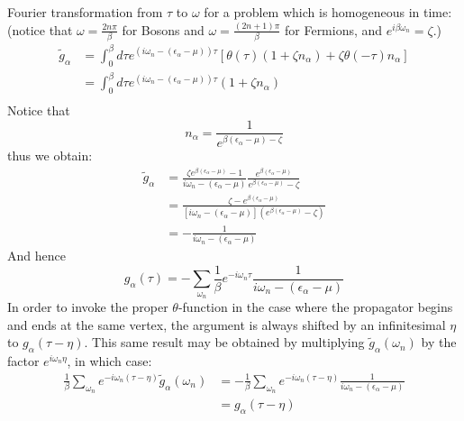 \documentclass[12pt]{article}
\begin{document}
Fourier transformation from $\tau$ to $\omega$ for a problem which is homogeneous in 
time: (notice that $\omega=\frac{2n\pi}{\beta}$ for Bosons and 
$\omega=\frac{(2n+1)\pi}{\beta}$ for Fermions, and $e^{i\beta\omega_n}=\zeta$.)
\begin{equation*}
    \begin{split}
        \tilde{g}_\alpha&=\int_0^\beta d\tau e^{(i\omega_n-(\epsilon_\alpha-\mu))\tau}
        [\theta(\tau)(1+\zeta n_\alpha)+\zeta\theta(-\tau)n_\alpha]\\
        &=\int_0^\beta d\tau e^{(i\omega_n-(\epsilon_\alpha-\mu))\tau}(1+\zeta n_\alpha)\\
    \end{split}
\end{equation*}
Notice that
\begin{equation*}
    n_\alpha=\frac{1}{e^{\beta(\epsilon_\alpha-\mu)-\zeta}}
\end{equation*}
thus we obtain:
\begin{equation*}
    \begin{split}
        \tilde{g}_\alpha&=\frac{\zeta e^{\beta(\epsilon_\alpha-\mu)}-1}
        {i\omega_n-(\epsilon_\alpha-\mu)}\frac{e^{\beta(\epsilon_\alpha-\mu)}}
        {e^{\beta(\epsilon_\alpha-\mu)}-\zeta}\\
        &=\frac{\zeta-e^{\beta(\epsilon_\alpha-\mu)}}{[i\omega_n-(\epsilon_\alpha-\mu)]
        (e^{\beta(\epsilon_\alpha-\mu)}-\zeta)}\\
        &=-\frac{1}{i\omega_n-(\epsilon_\alpha-\mu)}
    \end{split}
\end{equation*}
And hence
\begin{equation*}
    g_\alpha(\tau)=-\sum_{\omega_n}\frac{1}{\beta}e^{-i\omega_n\tau}
    \frac{1}{i\omega_n-(\epsilon_\alpha-\mu)}
\end{equation*}
In order to invoke the proper $\theta$-function in the case where the propagator 
begins and ends at the same vertex, the argument is always shifted by an infinitesimal 
$\eta$ to $g_\alpha(\tau-\eta)$. This same result may be obtained by multiplying 
$\tilde{g}_\alpha(\omega_n)$ by the factor $e^{i\omega_n\eta}$, in which case:
\begin{equation*}
    \begin{split}
        \frac{1}{\beta}\sum_{\omega_n}e^{-i\omega_n(\tau-\eta)}\tilde{g}_\alpha(\omega_n)
        &=-\frac{1}{\beta}\sum_{\omega_n}e^{-i\omega_n(\tau-\eta)}
        \frac{1}{i\omega_n-(\epsilon_\alpha-\mu)}\\
        &=g_\alpha(\tau-\eta)
    \end{split}
\end{equation*} 
\end{document}
